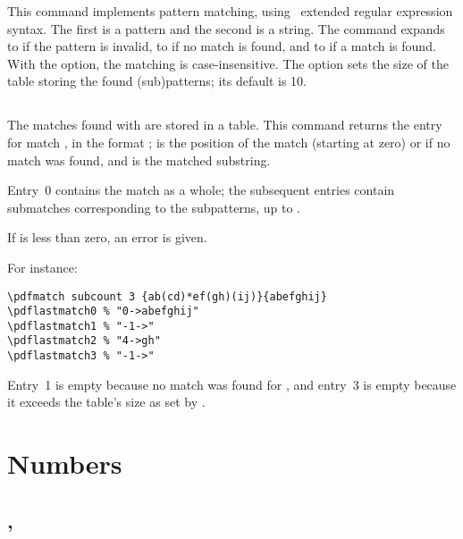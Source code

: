 \documentclass{pdftexmanual}
\begin{document}
This command implements pattern matching, using \POSIX\ extended regular
expression syntax. The first  is a pattern and
the second is a string. The command expands to  if the pattern
is invalid, to  if no match is found, and to  if a match
is found. With the  option, the matching is
case-insensitive. The  option sets the size of the table
storing the found (sub)patterns; its default is 10. 

\subsection{}

The matches found with  are stored in a table. This command
returns the entry for match , in the format
\type{->};  is
the position of the match (starting at zero) or  if no match
was found, and  is the matched substring.

Entry~0 contains the match as a whole; the subsequent entries contain
submatches corresponding to the subpatterns, up to .

If  is less than zero, an error is given.

For instance:

\begin{verbatim}
\pdfmatch subcount 3 {ab(cd)*ef(gh)(ij)}{abefghij}
\pdflastmatch0 % "0->abefghij"
\pdflastmatch1 % "-1->"
\pdflastmatch2 % "4->gh"
\pdflastmatch3 % "-1->"
\end{verbatim}

Entry~1 is empty because no match was found for , and entry~3
is empty because it exceeds the table's size as set by .

\section{Numbers}

\subsection{, }
\end{document}
